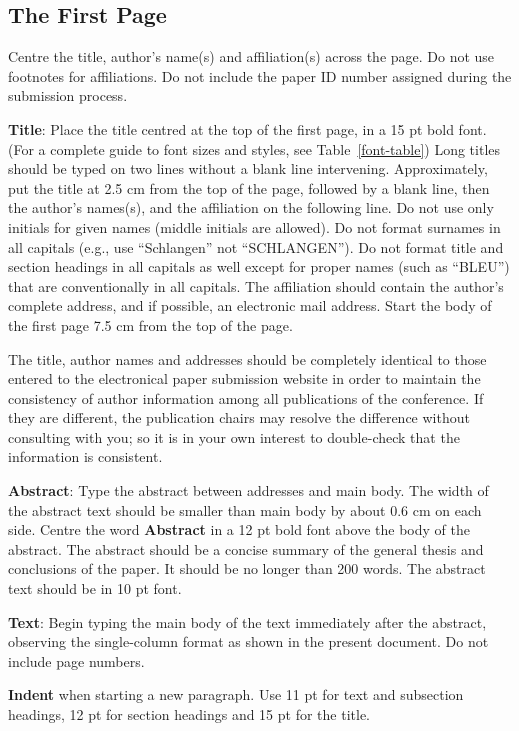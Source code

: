 \documentclass[11pt]{article}
\begin{document}
\subsection{The First Page}
\label{ssec:first}

Centre the title, author's name(s) and affiliation(s) across
the page.
Do not use footnotes for affiliations. Do not include the
paper ID number assigned during the submission process.

{\bf Title}: Place the title centred at the top of the first page, in
a 15 pt bold font. (For a complete guide to font sizes and styles,
see Table~\ref{font-table}) Long titles should be typed on two lines
without a blank line intervening. Approximately, put the title at 2.5
cm from the top of the page, followed by a blank line, then the
author's names(s), and the affiliation on the following line. Do not
use only initials for given names (middle initials are allowed). Do
not format surnames in all capitals (e.g., use ``Schlangen'' not
``SCHLANGEN'').  Do not format title and section headings in all
capitals as well except for proper names (such as ``BLEU'') that are
conventionally in all capitals.  The affiliation should contain the
author's complete address, and if possible, an electronic mail
address. Start the body of the first page 7.5 cm from the top of the
page.

The title, author names and addresses should be completely identical
to those entered to the electronical paper submission website in order
to maintain the consistency of author information among all
publications of the conference. If they are different, the publication
chairs may resolve the difference without consulting with you; so it
is in your own interest to double-check that the information is
consistent.

{\bf Abstract}: Type the abstract between addresses and main body.
The width of the abstract text should be
smaller than main body by about 0.6 cm on each side.
Centre the word {\bf Abstract} in a 12 pt bold
font above the body of the abstract. The abstract should be a concise
summary of the general thesis and conclusions of the paper. It should
be no longer than 200 words. The abstract text should be in 10 pt font.

{\bf Text}: Begin typing the main body of the text immediately after
the abstract, observing the single-column format as shown in 
the present document. Do not include page numbers.

{\bf Indent} when starting a new paragraph. Use 11 pt for text and 
subsection headings, 12 pt for section headings and 15 pt for
the title. 
\end{document}
